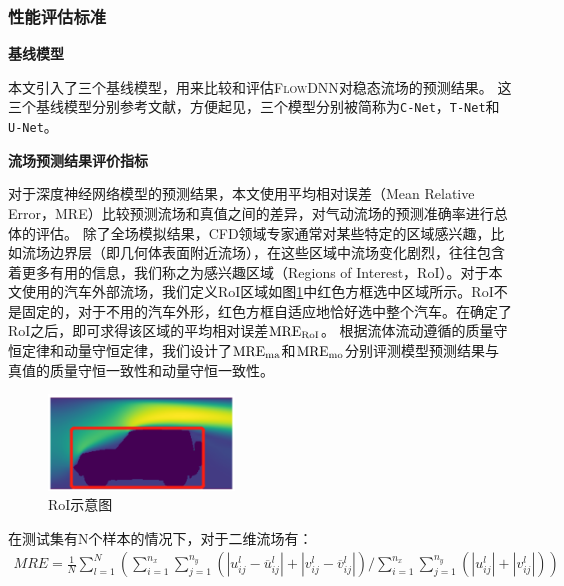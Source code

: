 \subsubsection{性能评估标准}

\textbf{基线模型}

本文引入了三个基线模型，用来比较和评估\textsc{FlowDNN}对稳态流场的预测结果。
这三个基线模型分别参考文献\cite{DBLP:conf/kdd/GuoLI16,thuerey2019deep,DBLP:conf/miccai/RonnebergerFB15}，方便起见，三个模型分别被简称为\texttt{C-Net}，\texttt{T-Net}和\texttt{U-Net}。


\textbf{流场预测结果评价指标}

对于深度神经网络模型的预测结果，本文使用平均相对误差（Mean Relative Error，MRE）比较预测流场和真值之间的差异，对气动流场的预测准确率进行总体的评估。
除了全场模拟结果，CFD领域专家通常对某些特定的区域感兴趣，比如流场边界层（即几何体表面附近流场），在这些区域中流场变化剧烈，往往包含着更多有用的信息，我们称之为感兴趣区域（Regions of Interest，RoI）。对于本文使用的汽车外部流场，我们定义RoI区域如图\ref{fig:errors_area}中红色方框选中区域所示。RoI不是固定的，对于不用的汽车外形，红色方框自适应地恰好选中整个汽车。在确定了RoI之后，即可求得该区域的平均相对误差$\rm{MRE_{RoI}}$。
根据流体流动遵循的质量守恒定律和动量守恒定律，我们设计了${\rm{MRE}_{ma}}$和${\rm{MRE}_{mo}}$分别评测模型预测结果与真值的质量守恒一致性和动量守恒一致性。

\begin{figure}[htp]
	\centering
	\includegraphics[width=0.44\textwidth]{figures/data/data_rep/errors.png}
	\caption{RoI示意图}	
	\label{fig:errors_area}
\end{figure}

在测试集有N个样本的情况下，对于二维流场有：
\begin{align}
MRE = { \frac{1}{N} \sum\limits_{l = 1}^N  \left( {\sum\limits_{i = 1}^{{n_x}} {\sum\limits_{j = 1}^{{n_y}} {\left( {\left| {u_{ij}^l - \overline u _{ij}^l} \right| + \left| {v_{ij}^l - \overline v _{ij}^l} \right|} \right)} } } / {{\sum\limits_{i = 1}^{{n_x}} {\sum\limits_{j = 1}^{{n_y}} {\left( {\left| {u _{ij}^l} \right| + \left| { v _{ij}^l} \right|} \right)} } }} \right) }
\end{align}

